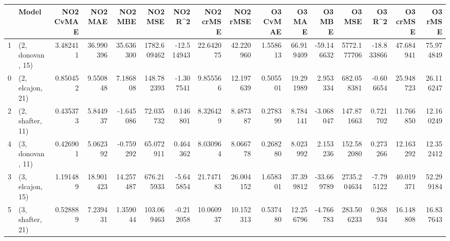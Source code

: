 \begin{tabular}{llrrrrrrrrrrrrrr}
\toprule
{} &             Model &  NO2 CvMAE &    NO2 MAE &    NO2 MBE &      NO2 MSE &    NO2 R\textasciicircum2 &  NO2 crMSE &   NO2 rMSE &  O3 CvMAE &     O3 MAE &     O3 MBE &       O3 MSE &     O3 R\textasciicircum2 &   O3 crMSE &    O3 rMSE \\
\midrule
1 &  (2, donovan, 15) &   3.482411 &  36.990396 &  35.636300 &  1782.609462 & -12.514943 &  22.642075 &  42.220960 &  1.558613 &  66.919409 & -59.146632 &  5772.177706 & -18.833866 &  47.684941 &  75.974849 \\
0 &  (2, elcajon, 21) &   0.850452 &   9.550848 &   7.186808 &   148.782393 &  -1.307541 &   9.855566 &  12.197639 &  0.505501 &  19.291989 &   2.953334 &   682.058381 &  -0.606654 &  25.948723 &  26.116247 \\
2 &  (2, shafter, 11) &   0.435373 &   5.844937 &  -1.645086 &    72.035732 &   0.146801 &   8.326429 &   8.487387 &  0.278399 &   8.784141 &  -3.068047 &   147.871663 &   0.721702 &  11.766850 &  12.160249 \\
4 &  (3, donovan, 11) &   0.426901 &   5.062392 &  -0.759292 &    65.072911 &   0.464362 &   8.030964 &   8.066778 &  0.268280 &   8.023992 &   2.153236 &   152.582080 &   0.273266 &  12.163292 &  12.352412 \\
3 &  (3, elcajon, 15) &   1.191489 &  18.901423 &  14.257487 &   676.215933 &  -5.645854 &  21.747183 &  26.004152 &  1.658301 &  37.399812 & -33.669789 &  2735.204634 &  -7.795122 &  40.019371 &  52.299184 \\
5 &  (3, shafter, 21) &   0.528889 &   7.239431 &   1.359044 &   103.069463 &  -0.212058 &  10.060937 &  10.152313 &  0.537480 &  12.256796 &  -4.766783 &   283.506233 &   0.268934 &  16.148808 &  16.837643 \\
\bottomrule
\end{tabular}
